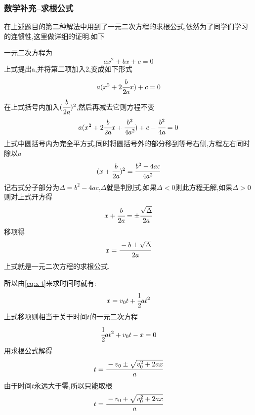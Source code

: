 \subsubsection{数学补充--求根公式}

在上述题目的第二种解法中用到了一元二次方程的求根公式,依然为了同学们学习的连惯性,这里做详细的证明.如下

一元二次方程为
$$ax^2+bx+c=0$$
上式提出a,并将第二项加入2,变成如下形式
$$a(x^2+2\cfrac{b}{2a}x)+c=0$$
在上式括号内加入$(\cfrac{b}{2a})^2$,然后再减去它则方程不变
$$a(x^2+2\cfrac{b}{2a}x+\cfrac{b^2}{4a^2})+c-\cfrac{b^2}{4a}=0$$
上式中圆括号内为完全平方式,同时将圆括号外的部分移到等号右侧,方程左右同时除以$a$
$$(x+\cfrac{b}{2a})^2=\cfrac{b^2-4ac}{4a^2}$$
记右式分子部分为$\Delta = b^2-4ac$,$\Delta$就是判别式,如果$\Delta <0$则此方程无解,如果$\Delta>0$则对上式开方得
$$x+\cfrac{b}{2a}=\pm \cfrac{\sqrt{\Delta}}{2a}$$
移项得
$$x=\cfrac{-b\pm \sqrt{\Delta}}{2a}$$
上式就是一元二次方程的求根公式.

所以由\eqref{eq:x-t}来求时间时就有:
$$x=v_0t+\cfrac{1}{2}at^2$$
上式移项则相当于关于时间$t$的一元二次方程
$$\cfrac{1}{2}at^2+v_0t-x=0$$
用求根公式解得
$$t=\cfrac{-v_0\pm\sqrt{v_0^2+2ax}}{a}$$
由于时间$t$永远大于零,所以只能取根
$$t=\cfrac{-v_0+\sqrt{v_0^2+2ax}}{a}$$
